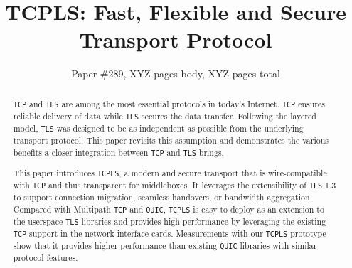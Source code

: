 \documentclass[sigconf]{acmart}
\newcommand{\tcpls}{\texttt{TCPLS}\xspace}
\newcommand{\tcp}{\texttt{TCP}\xspace}
\newcommand{\tls}{\texttt{TLS}\xspace}
\newcommand{\quic}{\texttt{QUIC}\xspace}
\begin{document}
\title{TCPLS: Fast, Flexible and Secure Transport Protocol}

\author{Paper \#289, XYZ pages body, XYZ pages total}

\renewcommand{\shortauthors}{X.et al.}


\begin{abstract}
  \tcp and \tls are among the most essential protocols in today's Internet. \tcp ensures reliable delivery of data while \tls secures the data transfer. Following the layered model, \tls was designed to be as independent as possible from the underlying transport protocol. This paper revisits this assumption and demonstrates the various benefits a closer integration between \tcp and \tls brings.

  This paper introduces \tcpls, a modern and secure transport that is wire-compatible with \tcp and thus transparent for middleboxes. It leverages the extensibility of \tls 1.3 to support connection migration, seamless handovers, or bandwidth aggregation. Compared with Multipath \tcp and \quic, \tcpls is easy to deploy as an extension to the userspace \tls libraries and provides high performance by leveraging the existing \tcp support in the network interface cards. Measurements with our \tcpls prototype show that it provides higher performance than existing \quic libraries with similar protocol features.

\end{abstract}
\maketitle





\end{document}
